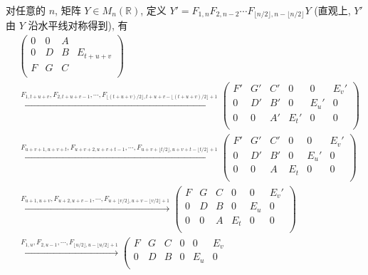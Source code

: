 \documentclass{ctexart}
\begin{document}
\begin{solution}
    对任意的 $n$, 矩阵 $Y\in M_{n}(\mathbb{R})$, 定义 $Y'=F_{1,n}F_{2,n-2}\cdots F_{\lfloor n/2\rfloor,n-\lfloor n/2\rfloor}Y$ (直观上, $Y'$ 由 $Y$ 沿水平线对称得到), 有
    \begin{align*}
        & \left(\begin{array}{ccc|c}
            0 & 0 & A & \\
            0 & D & B & E_{t+u+v} \\
            F & G & C & \\
        \end{array}\right) \\
        & \xrightarrow{F_{1,t+u+v},F_{2,t+u+v-1},\cdots,F_{\lfloor(t+u+v)/2\rfloor,t+u+v-\lfloor(t+u+v)/2\rfloor+1}}\left(\begin{array}{ccc|ccc}
            F' & G' & C'& 0   & 0   & E_v' \\
            0  & D' & B'& 0   & E_u' & 0   \\
            0  & 0  & A'& E_t' & 0   & 0   \\
        \end{array}\right) \\
        & \xrightarrow{F_{u+v+1,u+v+t},F_{u+v+2,u+v+t-1},\cdots,F_{u+v+\lfloor t/2\rfloor,u+v+t-\lfloor t/2\rfloor+1}}\left(\begin{array}{ccc|ccc}
            F' & G' & C' & 0   & 0   & E_v' \\
            0  & D' & B' & 0   & E_u' & 0   \\
            0  & 0  & A  & E_t & 0   & 0   \\
        \end{array}\right) \\
        & \xrightarrow{F_{u+1,u+v},F_{u+2,u+v-1},\cdots,F_{u+\lfloor v/2\rfloor,u+v-\lfloor v/2\rfloor+1}}\left(\begin{array}{ccc|ccc}
            F & G & C & 0   & 0   & E_v' \\
            0 & D & B & 0   & E_u & 0   \\
            0 & 0 & A & E_t & 0   & 0   \\
        \end{array}\right) \\
        & \xrightarrow{F_{1,u},F_{2,u-1},\cdots,F_{\lfloor u/2\rfloor,u-\lfloor u/2\rfloor+1}}\left(\begin{array}{ccc|ccc}
            F & G & C & 0   & 0   & E_v \\
            0 & D & B & 0   & E_u & 0   \\

\end{array}
\end{align*}
\end{solution}
\end{document}
